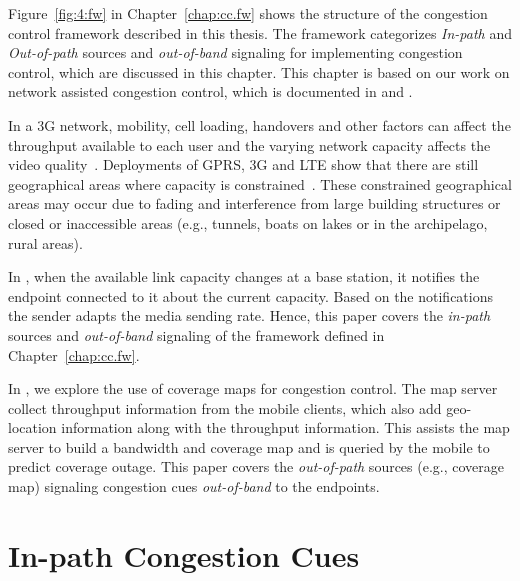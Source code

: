 Figure~\ref{fig:4:fw} in Chapter~\ref{chap:cc.fw} shows the structure of the
congestion control framework described in this thesis. The framework
categorizes \emph{In-path} and \emph{Out-of-path} sources and
\emph{out-of-band} signaling for implementing congestion control, which are
discussed in this chapter. This chapter is based on our work on network
assisted congestion control, which is documented in  and
.

In a 3G network, mobility, cell loading, handovers and other factors can
affect the throughput available to each user and the varying network capacity
affects the video quality~\cite{diaz2007evaluating}. Deployments of GPRS, 3G
and LTE show that there are still geographical areas where capacity is
constrained~\cite{Curcio:glass, 6576402}. These constrained geographical areas
may occur due to fading and interference from large building structures or
closed or inaccessible areas (e.g., tunnels, boats on lakes or in the
archipelago, rural areas).

In , when the available link capacity changes at a base
station, it notifies the endpoint connected to it about the current capacity.
Based on the notifications the sender adapts the media sending rate. Hence,
this paper covers the \emph{in-path} sources and \emph{out-of-band} signaling
of the framework defined in Chapter~\ref{chap:cc.fw}.

In , we explore the use of coverage maps for congestion
control. The map server collect throughput information from the mobile
clients, which also add geo-location information along with the throughput
information. This assists the map server to build a bandwidth and coverage map
and is queried by the mobile to predict coverage outage. This paper covers the
\emph{out-of-path} sources (e.g., coverage map) signaling congestion cues
\emph{out-of-band} to the endpoints.

\section{In-path Congestion Cues}


